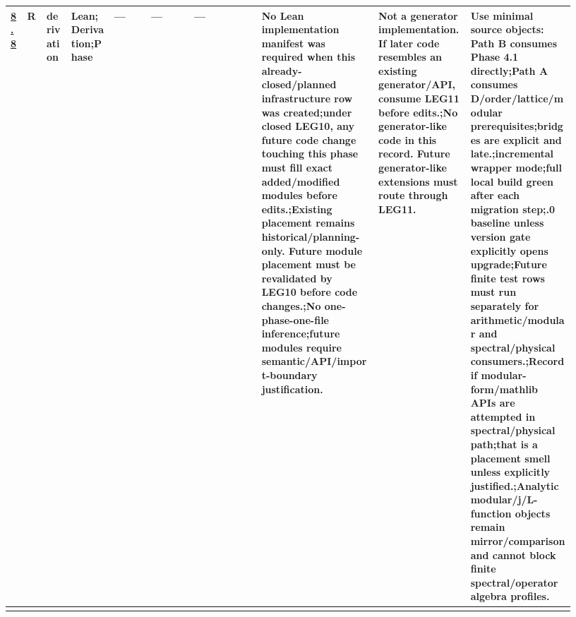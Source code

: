 \begin{longtable}{L{0.026\linewidth} L{0.024\linewidth} L{0.045\linewidth} L{0.07\linewidth} L{0.065\linewidth} L{0.075\linewidth} L{0.11\linewidth} L{0.19\linewidth} L{0.155\linewidth} L{0.17\linewidth}}
\hyperlink{phase-row-8-8}{8.8} & R & derivation & Lean;\newline Derivation;\newline Phase & --- & --- & --- & No Lean implementation manifest was required when this already-closed/\allowbreak{}planned infrastructure row was created;\newline under closed LEG10, any future code change touching this phase must fill exact added/\allowbreak{}modified modules before edits.;\newline Existing placement remains historical/\allowbreak{}planning-only. Future module placement must be revalidated by LEG10 before code changes.;\newline No one-phase-one-file inference;\newline future modules require semantic/\allowbreak{}API/\allowbreak{}import-boundary justification. & Not a generator implementation. If later code resembles an existing generator/\allowbreak{}API, consume LEG11 before edits.;\newline No generator-like code in this record. Future generator-like extensions must route through LEG11. & Use minimal source objects: Path B consumes Phase 4.1 directly;\newline Path A consumes D/\allowbreak{}order/\allowbreak{}lattice/\allowbreak{}modular prerequisites;\newline bridges are explicit and late.;\newline incremental wrapper mode;\newline full local build green after each migration step;.0 baseline unless version gate explicitly opens upgrade;\newline Future finite test rows must run separately for arithmetic/\allowbreak{}modular and spectral/\allowbreak{}physical consumers.;\newline Record if modular-form/\allowbreak{}mathlib APIs are attempted in spectral/\allowbreak{}physical path;\newline that is a placement smell unless explicitly justified.;\newline Analytic modular/\allowbreak{}j/\allowbreak{}L-function objects remain mirror/\allowbreak{}comparison and cannot block finite spectral/\allowbreak{}operator algebra profiles.\\
\hline
\addlinespace[0.24em]

\end{longtable}
